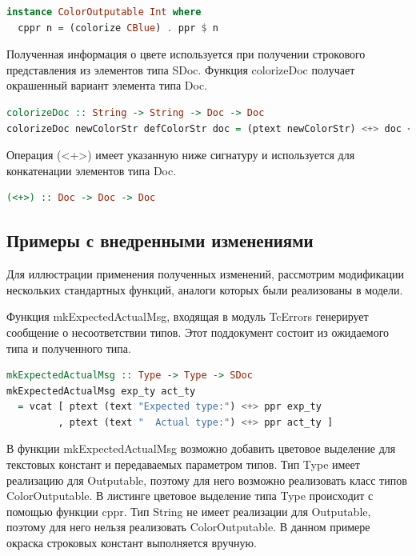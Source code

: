 \begin{lstlisting}[language=Haskell, caption=Пример реализации ColorOutputable для типа Int]
instance ColorOutputable Int where
  cppr n = (colorize CBlue) . ppr $ n
\end{lstlisting}

Полученная информация о цвете используется при получении строкового представления из элементов типа SDoc. Функция colorizeDoc получает окрашенный вариант элемента типа Doc.

\begin{lstlisting}[language=Haskell]
colorizeDoc :: String -> String -> Doc -> Doc
colorizeDoc newColorStr defColorStr doc = (ptext newColorStr) <+> doc <+> (ptext defColorStr)
\end{lstlisting}

Операция (<+>) имеет указанную ниже сигнатуру и используется для конкатенации элементов типа Doc.
\begin{lstlisting}[language=Haskell]
(<+>) :: Doc -> Doc -> Doc
\end{lstlisting}

\subsection{Примеры с внедренными изменениями}
Для иллюстрации применения полученных изменений, рассмотрим модификации нескольких стандартных функций, аналоги которых были реализованы в модели.

Функция mkExpectedActualMsg, входящая в модуль TcErrors генерирует сообщение о несоответствии типов. Этот поддокумент состоит из ожидаемого типа и полученного типа.

\begin{lstlisting}[language=Haskell]
mkExpectedActualMsg :: Type -> Type -> SDoc
mkExpectedActualMsg exp_ty act_ty
  = vcat [ ptext (text "Expected type:") <+> ppr exp_ty
         , ptext (text "  Actual type:") <+> ppr act_ty ]
\end{lstlisting}

В функции mkExpectedActualMsg возможно добавить цветовое выделение для текстовых констант и передаваемых параметром типов. Тип Type имеет реализацию для Outputable, поэтому для него возможно реализовать класс типов ColorOutputable. В листинге цветовое выделение типа Type происходит с помощью функции cppr. Тип String не имеет реализации для Outputable, поэтому для него нельзя реализовать ColorOutputable. В данном примере окраска строковых констант выполняется вручную.

